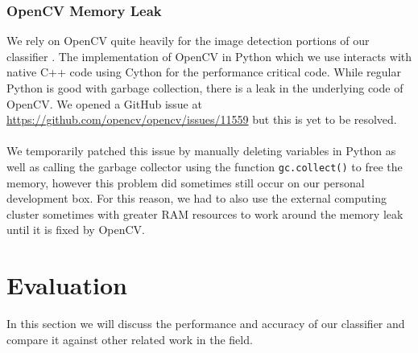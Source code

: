 \documentclass[12pt,twoside]{report}
\begin{document}
\subsection{OpenCV Memory Leak}
We rely on OpenCV quite heavily for the image detection portions of our classifier \cite{opencv}. The implementation of OpenCV in Python which we use interacts with native C++ code using Cython for the performance critical code. While regular Python is good with garbage collection, there is a leak in the underlying code of OpenCV. We opened a GitHub issue at \url{https://github.com/opencv/opencv/issues/11559} but this is yet to be resolved.
\\\\
We temporarily patched this issue by manually deleting variables in Python as well as calling the garbage collector using the function \texttt{gc.collect()} to free the memory, however this problem did sometimes still occur on our personal development box. For this reason, we had to also use the external computing cluster sometimes with greater RAM resources to work around the memory leak until it is fixed by OpenCV.
\newpage
\chapter{Evaluation}
In this section we will discuss the performance and accuracy of our classifier and compare it against other related work in the field.
\end{document}

